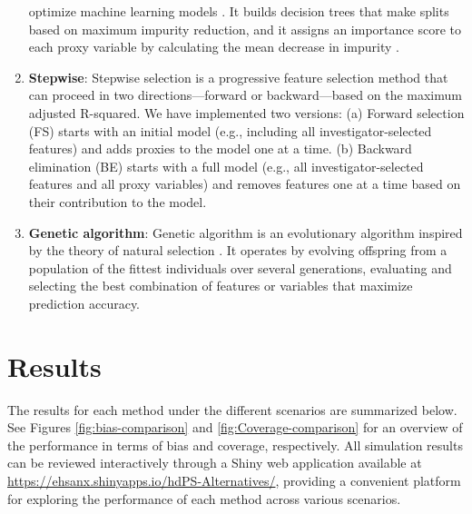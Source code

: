 \documentclass[sn-vancouver,Numbered,lineno,pdflatex]{sn-jnl}
\begin{document}
\begin{enumerate}
  optimize machine learning models \citep{chen2016xgboost}. It builds
  decision trees that make splits based on maximum impurity reduction,
  and it assigns an importance score to each proxy variable by
  calculating the mean decrease in impurity
  \citep{xiao2024interpretable}.
\item
  \textbf{Stepwise}: Stepwise selection is a progressive feature
  selection method that can proceed in two directions---forward or
  backward---based on the maximum adjusted R-squared. We have
  implemented two versions: (a) Forward selection (FS) starts with an
  initial model (e.g., including all investigator-selected features) and
  adds proxies to the model one at a time. (b) Backward elimination (BE)
  starts with a full model (e.g., all investigator-selected features and
  all proxy variables) and removes features one at a time based on their
  contribution to the model.
\item
  \textbf{Genetic algorithm}: Genetic algorithm is an evolutionary
  algorithm inspired by the theory of natural selection
  \citep{holland1975adaptation}. It operates by evolving offspring from
  a population of the fittest individuals over several generations,
  evaluating and selecting the best combination of features or variables
  that maximize prediction accuracy.
\end{enumerate}

\section{Results}\label{results}

The results for each method under the different scenarios are summarized
below. See Figures \ref{fig:bias-comparison} and
\ref{fig:Coverage-comparison} for an overview of the performance in
terms of bias and coverage, respectively. All simulation results can be
reviewed interactively through a Shiny web application available at
\url{https://ehsanx.shinyapps.io/hdPS-Alternatives/}, providing a
convenient platform for exploring the performance of each method across
various scenarios.
\end{document}
